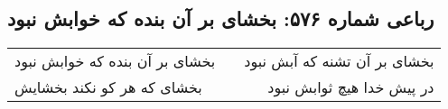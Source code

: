 \begin{center}
\section*{رباعی شماره ۵۷۶: بخشای بر آن بنده که خوابش نبود}
\label{sec:0576}
\begin{longtable}{l p{0.5cm} r}
بخشای بر آن بنده که خوابش نبود
&&
بخشای بر آن تشنه که آبش نبود
\\
بخشای که هر کو نکند بخشایش
&&
در پیش خدا هیچ ثوابش نبود
\\
\end{longtable}
\end{center}
